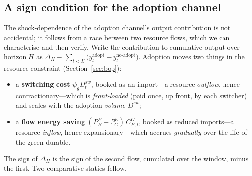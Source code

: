 \documentclass[11pt,a4paper]{article}
\begin{document}
\subsection{A sign condition for the adoption channel}
\label{sec:signmap}

The shock-dependence of the adoption channel's output contribution is not
accidental; it follows from a race between two resource flows, which we can
characterise and then verify. Write the contribution to cumulative output over
horizon $H$ as $\Delta_H\equiv\sum_{t<H}\big(y^{\text{adopt}}_t-y^{\text{no-adopt}}_t\big)$.
Adoption moves two things in the resource constraint (Section~\ref{sec:bop}):

\begin{itemize}\itemsep2pt
\item a \textbf{switching cost} $\psi_g D^{sw}_t$, booked as an import---a
resource \emph{outflow}, hence contractionary---which is \emph{front-loaded}
(paid once, up front, by each switcher) and scales with the adoption
\emph{volume} $D^{sw}$;
\item a \textbf{flow energy saving} $(P^{E}_{B}-P^{E}_{G})\,C^{G}_{E,t}$, booked
as reduced imports---a resource \emph{inflow}, hence expansionary---which
accrues \emph{gradually} over the life of the green durable.
\end{itemize}

\noindent The sign of $\Delta_H$ is the sign of the second flow, cumulated over
the window, minus the first. Two comparative statics follow.
\end{document}
